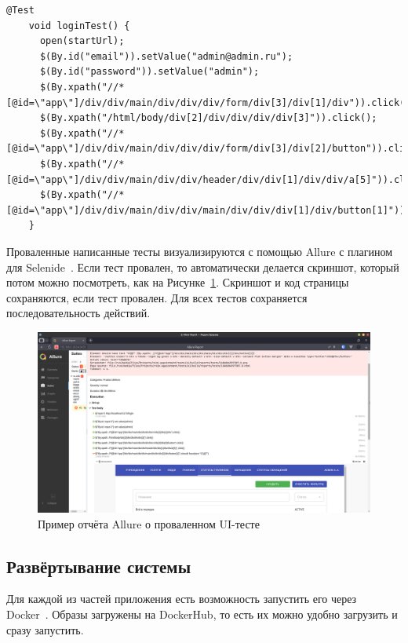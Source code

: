 \documentclass[a4paper,article]{article}
\begin{document}
\begin{sloppypar}
    \newpage
    
    \begin{lstlisting}[label=selenide,caption=Пример теста на Selenide]
    @Test
    void loginTest() {
      open(startUrl);
      $(By.id("email")).setValue("admin@admin.ru");
      $(By.id("password")).setValue("admin");
      $(By.xpath("//*[@id=\"app\"]/div/div/main/div/div/div/form/div[3]/div[1]/div")).click();
      $(By.xpath("/html/body/div[2]/div/div/div/div[3]")).click();
      $(By.xpath("//*[@id=\"app\"]/div/div/main/div/div/div/form/div[3]/div[2]/button")).click();
      $(By.xpath("//*[@id=\"app\"]/div/div/main/div/div/header/div/div[1]/div/div/a[5]")).click();
      $(By.xpath("//*[@id=\"app\"]/div/div/main/div/div/main/div/div/div[1]/div/button[1]")).shouldHave(text("СЗДТ"));
    }
    \end{lstlisting}
    
    Проваленные написанные тесты визуализируются с помощью Allure с плагином для Selenide~\cite{allure}. Если тест провален, то автоматически делается скриншот, который потом можно посмотреть, как на Рисунке~\ref{fig:allure}. Скриншот и код страницы сохраняются, если тест провален. Для всех тестов сохраняется последовательность действий.
    
    \begin{figure}[h]
        \centering
        \includegraphics[width=0.8\linewidth]{UI. Отчёт Allure.png}        
        \caption{\centering Пример отчёта Allure о проваленном UI-тесте}        
        \label{fig:allure}
    \end{figure}
    
    \newpage

    \subsection{Развёртывание системы}\label{Реализация. Сборка и развертывание}
    
    Для каждой из частей приложения есть возможность запустить его через Docker~\cite{dockerdoc}. Образы загружены на DockerHub, то есть их можно удобно загрузить и сразу запустить.
    

\end{sloppypar}
\end{document}
